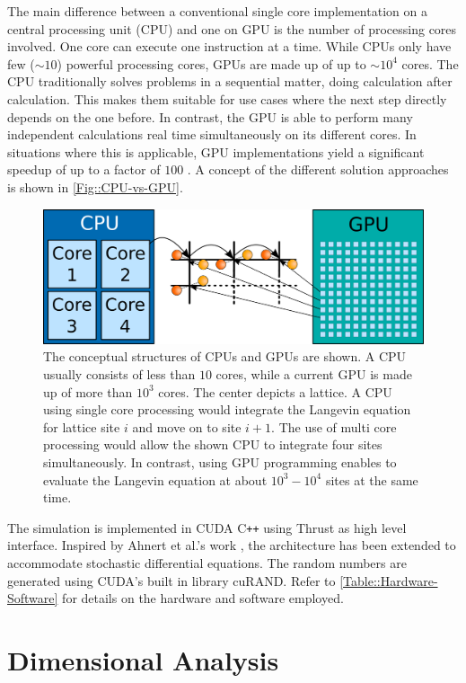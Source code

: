 	The main difference between a conventional single core implementation on a central processing unit (CPU) and one on GPU is the number of processing cores involved. One core can execute one  instruction at a time. While CPUs only have few ($\sim 10$) powerful processing cores, GPUs are made up of up to $\sim 10^4$ cores. The CPU traditionally solves problems in a sequential matter, doing calculation after calculation. This makes them suitable for use cases where the next step directly depends on the one before. In contrast, the GPU is able to perform many independent calculations real time simultaneously on its different cores. In situations where this is applicable, GPU implementations yield a significant speedup of up to a factor of $100$ \cite{che2008performance}. A concept of the different solution approaches is shown in \autoref{Fig::CPU-vs-GPU}.\\
	\begin{figure}[htp]
		\centering
		\includegraphics[width=0.8\linewidth]{graphics/CPU-vs-GPU-2.png}
		\caption{The conceptual structures of CPUs and GPUs are shown. A CPU usually consists of less than $10$ cores, while a current GPU is made up of more than $10^3$ cores. The center depicts a lattice. A CPU using single core processing would integrate the Langevin equation for lattice site $i$ and move on to site $i+1$. The use of multi core processing would allow the shown CPU to integrate four sites simultaneously. In contrast, using GPU programming enables to evaluate the Langevin equation at about $10^3 - 10^4$ sites at the same time.}
		\label{Fig::CPU-vs-GPU}
	\end{figure}
	
	The simulation is implemented in CUDA C\texttt{++} \cite{cuda} using Thrust \cite{thrust} as high level interface. Inspired by Ahnert et al.'s work \cite{ahnert2014solving}, the architecture has been extended to accommodate stochastic differential equations. The random numbers are generated using CUDA's built in library cuRAND. Refer to \autoref{Table::Hardware-Software} for details on the hardware and software employed.
	
	\section{Dimensional Analysis} \label{Section::quantitative}
